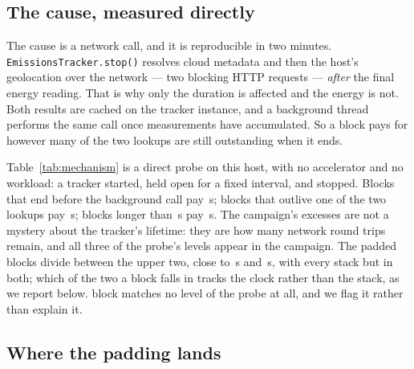 \subsection{The cause, measured directly}
\label{app:mechanism}

The cause is a network call, and it is reproducible in two minutes.
\texttt{EmissionsTracker.stop()} resolves cloud metadata and then the host's
geolocation over the network --- two blocking HTTP requests --- \emph{after} the
final energy reading. That is why only the duration is affected and the energy
is not. Both results are cached on the tracker instance, and a background thread
performs the same call once \vMechApiCallInterval{} measurements have
accumulated. So a block pays for however many of the two lookups are still
outstanding when it ends.

Table~\ref{tab:mechanism} is a direct probe on this host, with no accelerator
and no workload: a tracker started, held open for a fixed interval, and stopped.
Blocks that end before the background call pay
\vMechBothS\,\si{\second}; blocks that outlive one of the two lookups pay
\vMechOneS\,\si{\second}; blocks longer than \vMechThresholdS\,\si{\second} pay
\vMechNoneS\,\si{\second}. The campaign's excesses are not a mystery about the
tracker's lifetime: they are how many network round trips remain, and all three
of the probe's levels appear in the campaign. The padded blocks divide between
the upper two, close to \vMechOneS\,\si{\second} and \vMechBothS\,\si{\second},
with every stack but \vWindowUnpaddedEco{} in both; which of the two a block falls in tracks the clock
rather than the stack, as we report below. \vWindowModeThreeBlocks{} block
matches no level of the probe at all, and we flag it rather than explain it.

\begin{table}[t]
\centering
\caption{Cost of \texttt{EmissionsTracker.stop()} against the length of the
block it closes, measured directly on this host with no workload
(). The three levels are two, one and
zero outstanding network lookups. The probe's threshold of
\vMechThresholdS\,\si{\second} and the campaign's of
\vWindowThresholdS\,\si{\second} are one boundary estimated two ways.}
\label{tab:mechanism}
{\footnotesize\setlength{\tabcolsep}{3pt}}
\end{table}

\subsection{Where the padding lands}
\label{app:padding}

